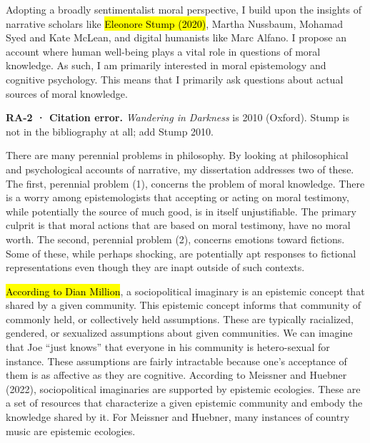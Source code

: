 \documentclass[
  letterpaper,
  DIV=11,
  numbers=noendperiod]{scrartcl}
\theoremstyle{remark}
\begin{document}
Adopting a broadly sentimentalist moral perspective, I build upon the
insights of narrative scholars like \hl{Eleonore Stump (2020)}, Martha
Nussbaum, Mohamad Syed and Kate McLean, and digital humanists like Marc
Alfano. I propose an account where human well-being plays a vital role
in questions of moral knowledge. As such, I am primarily interested in
moral epistemology and cognitive psychology. This means that I primarily
ask questions about actual sources of moral knowledge.

\begin{tcolorbox}[enhanced jigsaw, arc=.35mm, bottomrule=.15mm, bottomtitle=1mm, breakable, colback=white, colbacktitle=quarto-callout-warning-color!10!white, colframe=quarto-callout-warning-color-frame, coltitle=black, left=2mm, leftrule=.75mm, opacityback=0, opacitybacktitle=0.6, rightrule=.15mm, title=\textcolor{quarto-callout-warning-color}{\faExclamationTriangle}\hspace{0.5em}{Warning}, titlerule=0mm, toprule=.15mm, toptitle=1mm]

\textbf{RA-2 · Citation error.} \emph{Wandering in Darkness} is 2010
(Oxford). Stump is not in the bibliography at all; add Stump 2010.

\end{tcolorbox}

There are many perennial problems in philosophy. By looking at
philosophical and psychological accounts of narrative, my dissertation
addresses two of these. The first, perennial problem (1), concerns the
problem of moral knowledge. There is a worry among epistemologists that
accepting or acting on moral testimony, while potentially the source of
much good, is in itself unjustifiable. The primary culprit is that moral
actions that are based on moral testimony, have no moral worth. The
second, perennial problem (2), concerns emotions toward fictions. Some
of these, while perhaps shocking, are potentially apt responses to
fictional representations even though they are inapt outside of such
contexts.

\hl{According to Dian Million}, a sociopolitical imaginary is an
epistemic concept that shared by a given community. This epistemic
concept informs that community of commonly held, or collectively held
assumptions. These are typically racialized, gendered, or sexualized
assumptions about given communities. We can imagine that Joe ``just
knows'' that everyone in his community is hetero-sexual for instance.
These assumptions are fairly intractable because one's acceptance of
them is as affective as they are cognitive. According to Meissner and
Huebner (2022), sociopolitical imaginaries are supported by epistemic
ecologies. These are a set of resources that characterize a given
epistemic community and embody the knowledge shared by it. For Meissner
and Huebner, many instances of country music are epistemic ecologies.
\end{document}
